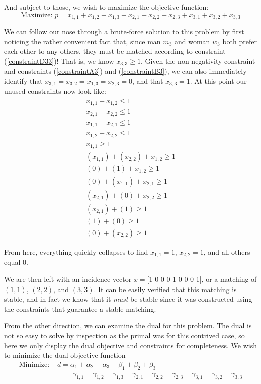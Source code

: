 \documentclass[twoside]{article}
\begin{document}
And subject to those, we wish to maximize the objective function:
\[
\text{Maximize:  } p = x_{1,1} + x_{1,2} + x_{1,3} + x_{2,1} + x_{2,2} + x_{2,3} + x_{3,1} + x_{3,2} + x_{3,3} 
\]

We can follow our nose through a brute-force solution to this problem by first noticing the rather convenient fact that, since man $m_3$ and woman $w_3$ both prefer each other to any others, they must be matched according to constraint (\ref{constraintD33})! That is, we know $x_{3,3} \geq 1$. Given the non-negativity constraint and constraints (\ref{constraintA3}) and (\ref{constraintB3}), we can also immediately identify that $x_{3,1}=x_{3,2}=x_{1,3}=x_{2,3}=0$, and that $x_{3,3}=1$. At this point our unused constraints now look like:
\begin{align*}
    x_{1,1} + x_{1,2} \leq 1 \tag{A'1}\\
    x_{2,1} + x_{2,2} \leq 1 \tag{A'2} \label{constraintA'2}\\
    x_{1,1} + x_{2,1} \leq 1 \tag{B'1}\\
    x_{1,2} + x_{2,2}\leq 1 \tag{B'2} \label{constraintB'2}\\
    x_{1,1} \geq 1 \tag{D'[1,1]}\\
    (x_{1,1}) + (x_{2,2}) + x_{1,2} \geq 1 \tag{D'[1,2]}\\
    (0) + (1) + x_{1,2} \geq 1 \tag{D'[1,3]}\\
    (0) + (x_{1,1}) + x_{2,1} \geq 1 \tag{D'[2,1]}\\
    (x_{2,1}) + (0) + x_{2,2} \geq 1 \tag{D'[2,2]}\\
    (x_{2,1}) + (1) \geq 1 \tag{D'[2,3]}\\
    (1) + (0) \geq 1 \tag{D'[3,1]}\\
    (0) + (x_{2,2})  \geq 1 \tag{D'[3,2]} \label{constraintD'32}
\end{align*}

From here, everything quickly collapses to find $x_{1,1}=1$, $x_{2,2}=1$, and all others equal $0$.

We are then left with an incidence vector $x = $[1 0 0 0 1 0 0 0 1], or a matching of $(1,1)$, $(2,2)$, and $(3,3)$. It can be easily verified that this matching is stable, and in fact we know that it \textit{must} be stable since it was constructed using the constraints that guarantee a stable matching.

From the other direction, we can examine the dual for this problem. The dual is not so easy to solve by inspection as the primal was for this contrived case, so here we only display the dual objective and constraints for completeness. We wish to minimize the dual objective function
\begin{align*}
\text{Minimize:  } &d = \alpha_1 + \alpha_2 + \alpha_3 + \beta_1 + \beta_2 + \beta_3\\
&\quad - \gamma_{1,1} - \gamma_{1,2} - \gamma_{1,3} - \gamma_{2,1} - \gamma_{2,2} - \gamma_{2,3} - \gamma_{3,1} - \gamma_{3,2} - \gamma_{3,3}
\end{align*}
\end{document}

